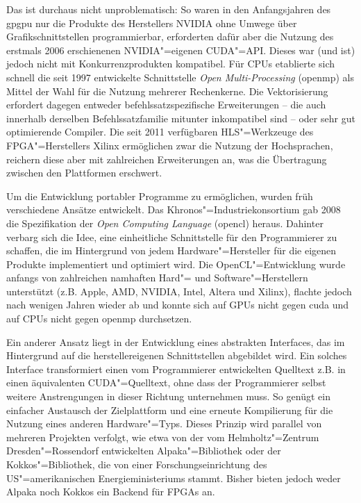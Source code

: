 Das ist durchaus nicht unproblematisch: So waren in den Anfangsjahren des
\gls{gpgpu} nur die Produkte des Herstellers NVIDIA ohne Umwege über
Grafikschnittstellen programmierbar, erforderten dafür aber die Nutzung des
erstmals 2006 erschienenen NVIDIA"=eigenen CUDA"=API. Dieses war (und ist)
jedoch nicht mit Konkurrenzprodukten kompatibel. Für CPUs etablierte sich
schnell die seit 1997 entwickelte Schnittstelle \textit{Open Multi-Processing}
(\gls{openmp}) als Mittel der Wahl für die Nutzung mehrerer Rechenkerne. Die
Vektorisierung erfordert dagegen entweder befehlssatzspezifische Erweiterungen
-- die auch innerhalb derselben Befehlssatzfamilie mitunter inkompatibel sind --
oder sehr gut optimierende Compiler. Die seit 2011 verfügbaren HLS"=Werkzeuge
des FPGA"=Herstellers Xilinx ermöglichen zwar die Nutzung der Hochsprachen,
reichern diese aber mit zahlreichen Erweiterungen an, was die Übertragung
zwischen den Plattformen erschwert.

Um die Entwicklung portabler Programme zu ermöglichen, wurden früh verschiedene
Ansätze entwickelt. Das Khronos"=Industriekonsortium gab 2008 die Spezifikation
der \textit{Open Computing Language} (\gls{opencl}) heraus. Dahinter verbarg sich
die Idee, eine einheitliche Schnittstelle für den Programmierer zu schaffen, die
im Hintergrund von jedem Hardware"=Hersteller für die eigenen Produkte
implementiert und optimiert wird. Die OpenCL"=Entwicklung wurde anfangs von
zahlreichen namhaften Hard"= und Software"=Herstellern unterstützt (z.B. Apple,
AMD, NVIDIA, Intel, Altera und Xilinx), flachte jedoch nach wenigen Jahren
wieder ab und konnte sich auf GPUs nicht gegen \gls{cuda} und auf CPUs nicht
gegen \gls{openmp} durchsetzen.

Ein anderer Ansatz liegt in der Entwicklung eines abstrakten Interfaces, das im
Hintergrund auf die herstellereigenen Schnittstellen abgebildet wird. Ein
solches Interface transformiert einen vom Programmierer entwickelten Quelltext
z.B. in einen äquivalenten CUDA"=Quelltext, ohne dass der Programmierer selbst
weitere Anstrengungen in dieser Richtung unternehmen muss. So genügt ein
einfacher Austausch der Zielplattform und eine erneute Kompilierung für die
Nutzung eines anderen Hardware"=Typs. Dieses Prinzip wird parallel von mehreren
Projekten verfolgt, wie etwa von der vom Helmholtz"=Zentrum Dresden"=Rossendorf
entwickelten Alpaka"=Bibliothek oder der Kokkos"=Bibliothek,
die von einer Forschungseinrichtung des US"=amerikanischen Energieministeriums
stammt. Bisher bieten jedoch weder Alpaka noch Kokkos ein Backend für FPGAs an.

